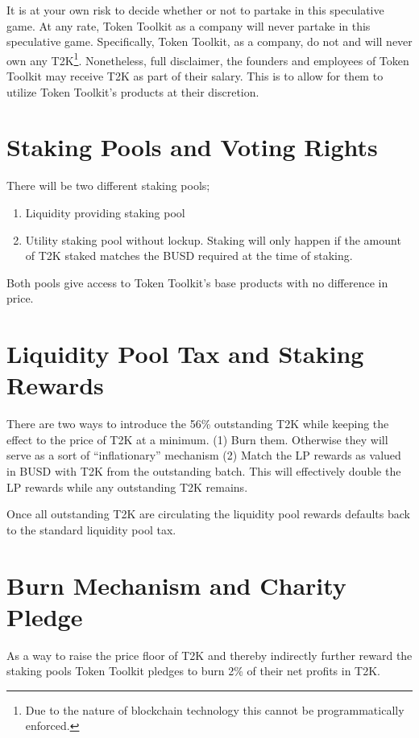 \documentclass[11pt]{article}
\begin{document}
It is at your own risk to decide whether or not to partake in this speculative
game. At any rate, Token Toolkit as a company will never partake in this
speculative game. Specifically, Token Toolkit, as a company, do not and will
never own any T2K\footnote{Due to the nature of blockchain technology this cannot be programmatically enforced.}. Nonetheless, full disclaimer, the founders and
employees of Token Toolkit may receive T2K as part of their salary. This is to
allow for them to utilize Token Toolkit's products at their discretion.

\section*{Staking Pools and Voting Rights}
\label{sec:orga8e26a9}
There will be two different staking pools;

\begin{enumerate}
\item Liquidity providing staking pool
\item Utility staking pool without lockup. Staking will only happen if the amount
of T2K staked matches the BUSD required at the time of staking.
\end{enumerate}

Both pools give access to Token Toolkit's base products with no difference in price.

\section*{Liquidity Pool Tax and Staking Rewards}
\label{sec:org132e171}

There are two ways to introduce the 56\% outstanding T2K while keeping the effect
to the price of T2K at a minimum. (1) Burn them. Otherwise they will serve as a
sort of ``inflationary'' mechanism (2) Match the LP rewards as valued in BUSD with
T2K from the outstanding batch. This will effectively double the LP rewards
while any outstanding T2K remains.

Once all outstanding T2K are circulating the liquidity pool rewards defaults
back to the standard liquidity pool tax.

\section*{Burn Mechanism and Charity Pledge}
\label{sec:org459f81a}

As a way to raise the price floor of T2K and thereby indirectly further reward
the staking pools Token Toolkit pledges to burn 2\% of their net profits in T2K.
\end{document}
